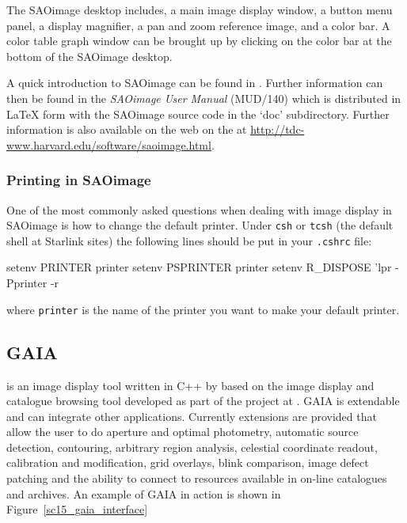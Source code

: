 \documentclass[twoside,11pt]{starlink}
\begin{document}
The SAOimage desktop includes, a main image display window, a button
menu panel, a display magnifier, a pan and zoom reference image, and a
color bar. A color table graph window can be brought up by clicking on
the color bar at the bottom of the SAOimage desktop.

A quick introduction to SAOimage can be found in
. Further information can then be found in the
\emph{SAOimage User Manual} (MUD/140) which is distributed in LaTeX
form with the SAOimage source code in the `doc' subdirectory. Further
information is also available on the web on the
 at
\url{http://tdc-www.harvard.edu/software/saoimage.html}.

\subsubsection{Printing in SAOimage}

One of the most commonly asked questions when dealing with image
display in SAOimage is how to change the default printer. Under \texttt{csh} or \texttt{tcsh} (the default shell at Starlink sites) the following
lines should be put in your \texttt{.cshrc} file:

\begin{small}
\begin{terminalv}
setenv PRINTER printer
setenv PSPRINTER printer
setenv R_DISPOSE 'lpr -Pprinter -r %
\end{terminalv}
\end{small}

where \verb+printer+ is the name of the printer you want to make your default printer.

\subsection{GAIA\label{sc15_gaia}}

 is an image display tool written in C++ by
 based
on the 
image display and catalogue browsing tool developed as part of the
 project at
. GAIA is extendable and
can integrate other applications. Currently extensions are provided
that allow the user to do aperture and optimal photometry, automatic
source detection, contouring, arbitrary region analysis, celestial
coordinate readout, calibration and modification, grid overlays, blink
comparison, image defect patching and the ability to connect to
resources available in on-line catalogues and archives. An example of
GAIA in action is shown in Figure~\ref{sc15_gaia_interface}
\end{document}
